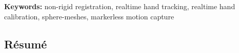 \textbf{Keywords:} non-rigid registration, realtime hand tracking, realtime hand calibration, sphere-meshes, markerless motion capture

\begin{otherlanguage}{french}
\cleardoublepage
\chapter*{Résumé}
\lipsum[1-2]
\end{otherlanguage}

